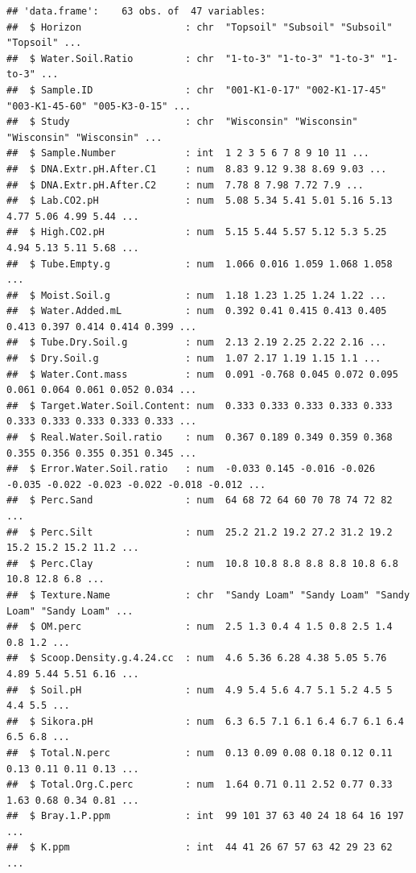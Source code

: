 \documentclass[]{article}
\begin{document}
\begin{verbatim}
## 'data.frame':    63 obs. of  47 variables:
##  $ Horizon                  : chr  "Topsoil" "Subsoil" "Subsoil" "Topsoil" ...
##  $ Water.Soil.Ratio         : chr  "1-to-3" "1-to-3" "1-to-3" "1-to-3" ...
##  $ Sample.ID                : chr  "001-K1-0-17" "002-K1-17-45" "003-K1-45-60" "005-K3-0-15" ...
##  $ Study                    : chr  "Wisconsin" "Wisconsin" "Wisconsin" "Wisconsin" ...
##  $ Sample.Number            : int  1 2 3 5 6 7 8 9 10 11 ...
##  $ DNA.Extr.pH.After.C1     : num  8.83 9.12 9.38 8.69 9.03 ...
##  $ DNA.Extr.pH.After.C2     : num  7.78 8 7.98 7.72 7.9 ...
##  $ Lab.CO2.pH               : num  5.08 5.34 5.41 5.01 5.16 5.13 4.77 5.06 4.99 5.44 ...
##  $ High.CO2.pH              : num  5.15 5.44 5.57 5.12 5.3 5.25 4.94 5.13 5.11 5.68 ...
##  $ Tube.Empty.g             : num  1.066 0.016 1.059 1.068 1.058 ...
##  $ Moist.Soil.g             : num  1.18 1.23 1.25 1.24 1.22 ...
##  $ Water.Added.mL           : num  0.392 0.41 0.415 0.413 0.405 0.413 0.397 0.414 0.414 0.399 ...
##  $ Tube.Dry.Soil.g          : num  2.13 2.19 2.25 2.22 2.16 ...
##  $ Dry.Soil.g               : num  1.07 2.17 1.19 1.15 1.1 ...
##  $ Water.Cont.mass          : num  0.091 -0.768 0.045 0.072 0.095 0.061 0.064 0.061 0.052 0.034 ...
##  $ Target.Water.Soil.Content: num  0.333 0.333 0.333 0.333 0.333 0.333 0.333 0.333 0.333 0.333 ...
##  $ Real.Water.Soil.ratio    : num  0.367 0.189 0.349 0.359 0.368 0.355 0.356 0.355 0.351 0.345 ...
##  $ Error.Water.Soil.ratio   : num  -0.033 0.145 -0.016 -0.026 -0.035 -0.022 -0.023 -0.022 -0.018 -0.012 ...
##  $ Perc.Sand                : num  64 68 72 64 60 70 78 74 72 82 ...
##  $ Perc.Silt                : num  25.2 21.2 19.2 27.2 31.2 19.2 15.2 15.2 15.2 11.2 ...
##  $ Perc.Clay                : num  10.8 10.8 8.8 8.8 8.8 10.8 6.8 10.8 12.8 6.8 ...
##  $ Texture.Name             : chr  "Sandy Loam" "Sandy Loam" "Sandy Loam" "Sandy Loam" ...
##  $ OM.perc                  : num  2.5 1.3 0.4 4 1.5 0.8 2.5 1.4 0.8 1.2 ...
##  $ Scoop.Density.g.4.24.cc  : num  4.6 5.36 6.28 4.38 5.05 5.76 4.89 5.44 5.51 6.16 ...
##  $ Soil.pH                  : num  4.9 5.4 5.6 4.7 5.1 5.2 4.5 5 4.4 5.5 ...
##  $ Sikora.pH                : num  6.3 6.5 7.1 6.1 6.4 6.7 6.1 6.4 6.5 6.8 ...
##  $ Total.N.perc             : num  0.13 0.09 0.08 0.18 0.12 0.11 0.13 0.11 0.11 0.13 ...
##  $ Total.Org.C.perc         : num  1.64 0.71 0.11 2.52 0.77 0.33 1.63 0.68 0.34 0.81 ...
##  $ Bray.1.P.ppm             : int  99 101 37 63 40 24 18 64 16 197 ...
##  $ K.ppm                    : int  44 41 26 67 57 63 42 29 23 62 ...

\end{verbatim}
\end{document}

